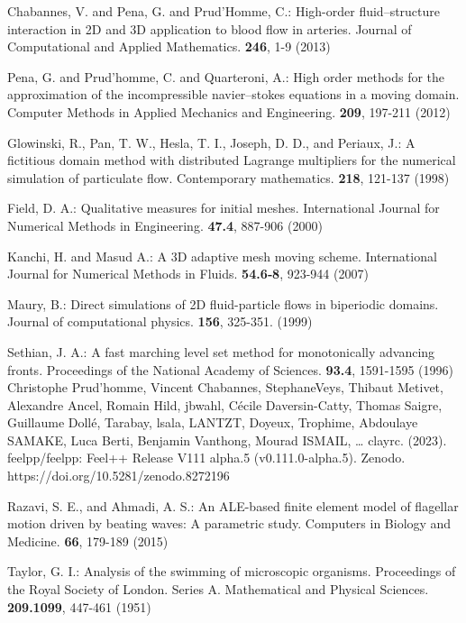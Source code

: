 \documentclass[graybox]{svmult}
\begin{document}
\begin{thebibliography}{99.}

Chabannes, V. and Pena, G. and Prud’Homme, C.: High-order fluid--structure interaction in 2D and 3D application to blood flow in arteries. Journal of Computational and Applied Mathematics. \textbf{246}, 1-9 (2013)

Pena, G. and Prud’homme, C. and Quarteroni, A.: High order methods for the approximation of the incompressible navier--stokes equations in a moving domain. Computer Methods in Applied Mechanics and Engineering. \textbf{209}, 197-211 (2012) 



Glowinski, R., Pan, T. W., Hesla, T. I., Joseph, D. D., and Periaux, J.: A fictitious domain method with distributed Lagrange multipliers for the numerical simulation of particulate flow. Contemporary mathematics. \textbf{218}, 121-137 (1998)

Field, D. A.: Qualitative measures for initial meshes. International Journal for Numerical Methods in Engineering. \textbf{47.4}, 887-906 (2000)


Kanchi, H. and Masud A.: A 3D adaptive mesh moving scheme. International Journal for Numerical Methods in Fluids. \textbf{54.6‐8}, 923-944 (2007)

Maury, B.:  Direct simulations of 2D fluid-particle flows in biperiodic domains. Journal of computational physics. \textbf{156}, 325-351. (1999)

Sethian, J. A.: A fast marching level set method for monotonically advancing fronts. Proceedings of the National Academy of Sciences. \textbf{93.4}, 1591-1595 (1996) 
Christophe Prud'homme, Vincent Chabannes, StephaneVeys, Thibaut Metivet, Alexandre Ancel, Romain Hild, jbwahl, Cécile Daversin-Catty, Thomas Saigre, Guillaume Dollé, Tarabay, lsala, LANTZT, Doyeux, Trophime, Abdoulaye SAMAKE, Luca Berti, Benjamin Vanthong, Mourad ISMAIL, … clayrc. (2023). feelpp/feelpp: Feel++ Release V111 alpha.5 (v0.111.0-alpha.5). Zenodo. https://doi.org/10.5281/zenodo.8272196

 Razavi, S. E., and Ahmadi, A. S.: An ALE-based finite element model of flagellar motion driven by beating waves: A parametric study. Computers in Biology and Medicine. \textbf{66}, 179-189 (2015)

Taylor, G. I.: Analysis of the swimming of microscopic organisms. Proceedings of the Royal Society of London. Series A. Mathematical and Physical Sciences. \textbf{209.1099}, 447-461 (1951)


\end{thebibliography}
\end{document}
